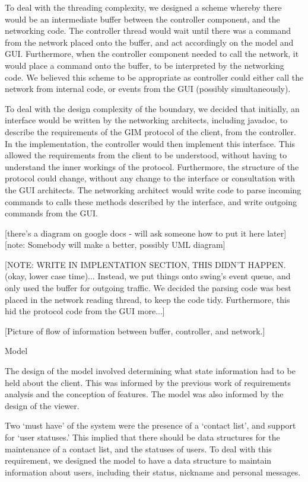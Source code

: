 To deal with the threading complexity, we designed a scheme whereby there would be an intermediate buffer between the controller component, and the networking code. The controller thread would wait until there was a command from the network placed onto the buffer, and act accordingly on the model and GUI. Furthermore, when the controller component needed to call the network, it would place a command onto the buffer, to be interpreted by the  networking code. We believed this scheme to be appropriate as controller could either call the network from internal code, or events from the GUI (possibly simultaneously).

To deal with the design complexity of the boundary, we decided that initially, an interface would be written by the networking architects, including javadoc, to describe the requirements of the GIM protocol of the client, from the controller. In the implementation, the controller would then implement this interface. This allowed the requirements from the client to be understood, without having to understand the inner workings of the protocol. Furthermore, the structure of the protocol could change, without any change to the interface or consultation with the GUI architects. The networking architect would write code to parse incoming commands to calls these methods described by the interface, and write outgoing commands from the GUI.

[there's a diagram on google docs - will ask someone how to put it here later]
[note: Somebody will make a better, possibly UML diagram]

[NOTE: WRITE IN IMPLENTATION SECTION, THIS DIDN’T HAPPEN. (okay, lower case time)... Instead, we put things onto swing’s event queue, and only used the buffer for outgoing traffic. We decided the parsing code was best placed in the network reading thread, to keep the code tidy. Furthermore, this hid the protocol code from the GUI more...]

[Picture of flow of information between buffer, controller, and network.]

Model

The design of the model involved determining what state information had to be held about the client. This was informed by the previous work of requirements analysis and the conception of features. The model was also informed by the design of the viewer.

Two ‘must have’ of the system were the presence of a ‘contact list’, and support for ‘user statuses.’ This implied that there should be data structures for the maintenance of a contact list, and the statuses of users. To deal with this requirement, we designed the model to have a data structure to maintain information about users, including their status, nickname and personal messages. 

